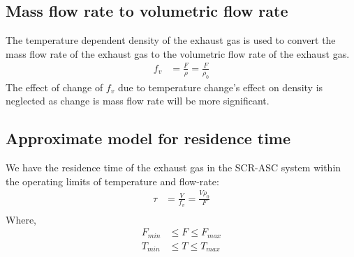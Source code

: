 \subsection{Mass flow rate to volumetric flow rate}
The temperature dependent density of the exhaust gas is used to convert the mass
flow rate of the exhaust gas to the volumetric flow rate of the exhaust gas.
\begin{align}
    f_v &= \frac{F}{\rho} = \frac{F}{\rho_0}  \label{eqn::fv_approx}
\end{align}
The effect of change of $f_v$ due to temperature change's effect on density is neglected as change is mass flow rate will be more significant.

\subsection{Approximate model for residence time}
We have the residence time of the exhaust gas in the SCR-ASC system within the operating limits of temperature and flow-rate:
\begin{align*}
    \tau &= \frac{V}{f_v} = \frac{V \rho_0}{F} \\
\end{align*}
Where,
\begin{align*}
    F_{min} &\leq F \leq F_{max}\\
    T_{min} &\leq T \leq T_{max}
\end{align*}
